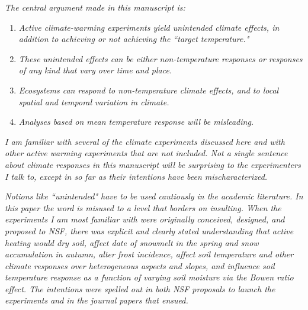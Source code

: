 \documentclass[11pt,a4paper]{letter}
\begin{document}
\begin{letter}{}
\emph{The central argument made in this manuscript is:}
\begin{enumerate}
\item \emph{Active climate-warming experiments yield unintended climate effects, in addition to achieving or not achieving the ``target temperature."}   
\item \emph{These unintended effects can be either non-temperature responses or responses of any kind that vary over time and place.}
\item \emph{Ecosystems can respond to non-temperature climate effects, and to local spatial and temporal variation in climate.}
\item \emph{Analyses based on mean temperature response will be misleading.}
\end{enumerate}

\emph{I am familiar with several of the climate experiments discussed here and with other active warming experiments that are not included.  Not a single sentence about climate responses in this manuscript will be surprising to the experimenters I talk to, except in so far as their intentions have been mischaracterized.}  

\emph{Notions like ``unintended" have to be used cautiously in the academic literature.  In this paper the word is misused to a level that borders on insulting.  When the experiments I am most familiar with were originally conceived, designed, and proposed to NSF, there was explicit and clearly stated understanding that active heating would dry soil, affect date of snowmelt in the spring and snow accumulation in autumn, alter frost incidence, affect soil temperature and other climate responses over heterogeneous aspects and slopes, and influence soil temperature response as a function of varying soil moisture via the Bowen ratio effect.  The intentions were spelled out in both NSF proposals to launch the experiments and in the journal papers that ensued.}


\end{letter}
\end{document}
